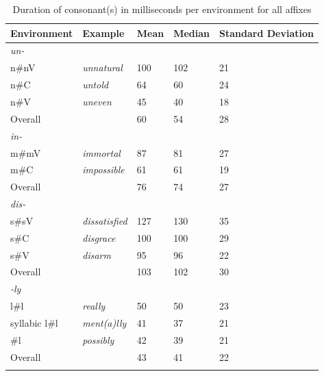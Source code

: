   \begin{table}
  	\caption{Duration of consonant(s) in milliseconds per environment for all affixes}
  	\label{tbl:Corpus raw duration}
  	
  		\begin{tabular} {lllll}
  			\lsptoprule
            Environment & Example & Mean & Median& Standard Deviation\\\midrule
  			\textit{un-}\\
  			\midrule			
  			n\#nV&\color{lsMidBlue}\textit{unnatural} & 100 & 102 & 21\\ 
  			n\#C&\color{lsMidBlue}\textit{untold} & 64 & 60 & 24\\ 
  			n\#V&\color{lsMidBlue}\textit{uneven} & 45 & 40 & 18\\
  			Overall &  & 60 & 54 & 28\\ 
  			\midrule
  			\textit{in-}\\
            \midrule			
  			m\#mV&\color{lsMidBlue}\textit{immortal} & 87 & 81 & 27\\   	
  			m\#C&\color{lsMidBlue}\textit{impossible} & 61 & 61 & 19\\ 
  			Overall &  & 76 & 74 & 27\\ 
  			\midrule   
  			\textit{dis-}\\
  			\midrule			
  			s\#sV&\color{lsMidBlue}\textit{dissatisfied} & 127 & 130  &35 \\ 
  			s\#C&\color{lsMidBlue}\textit{disgrace} & 100 & 100& 29\\ 
  			s\#V&\color{lsMidBlue}\textit{disarm} &95 & 96 & 22 \\ 
  			Overall &   &103   & 102  & 30  \\ 
  			\midrule   	
  			\textit{-ly}\\
  			\midrule
  			l\#l&\color{lsMidBlue}\textit{really} & 50  & 50 & 23 \\ 
  			\is{syllabicity}syllabic l\#l&\color{lsMidBlue}\textit{ment(a)lly} &41 & 37  & 21\\ 
  			\#l&\color{lsMidBlue}\textit{possibly} & 42& 39& 21\\ 
  			Overall &  &43  &41 &22\\ 
  			\lspbottomrule                                                                                
		\end{tabular}
  	
  \end{table}
  


